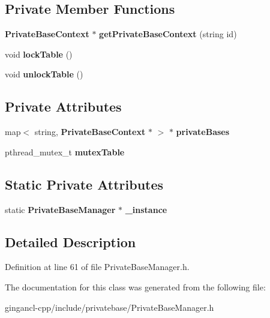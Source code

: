 \subsection*{Private Member Functions}
\begin{CompactItemize}
\item 
{\bf PrivateBaseContext} $\ast$ \textbf{getPrivateBaseContext} (string id)\label{classbr_1_1pucrio_1_1telemidia_1_1ginga_1_1ncl_1_1PrivateBaseManager_b78d7d80e50a5200083e61ab3e7e9d43}

\item 
void \textbf{lockTable} ()\label{classbr_1_1pucrio_1_1telemidia_1_1ginga_1_1ncl_1_1PrivateBaseManager_dba0565ed9dab1d1bdd3513a22ceabb3}

\item 
void \textbf{unlockTable} ()\label{classbr_1_1pucrio_1_1telemidia_1_1ginga_1_1ncl_1_1PrivateBaseManager_69bd9f7dd910e48ae15e9a4e6e870b3f}

\end{CompactItemize}
\subsection*{Private Attributes}
\begin{CompactItemize}
\item 
map$<$ string, {\bf PrivateBaseContext} $\ast$ $>$ $\ast$ {\bf privateBases}\label{classbr_1_1pucrio_1_1telemidia_1_1ginga_1_1ncl_1_1PrivateBaseManager_7aea553667207b6e4d4a44b0608a0ffe}

\item 
pthread\_\-mutex\_\-t {\bf mutexTable}\label{classbr_1_1pucrio_1_1telemidia_1_1ginga_1_1ncl_1_1PrivateBaseManager_c49695691836dad1f890543697522d80}

\end{CompactItemize}
\subsection*{Static Private Attributes}
\begin{CompactItemize}
\item 
static {\bf PrivateBaseManager} $\ast$ {\bf \_\-instance}\label{classbr_1_1pucrio_1_1telemidia_1_1ginga_1_1ncl_1_1PrivateBaseManager_6d9e0d1885f9a1bd634b6206005c0ffc}

\end{CompactItemize}


\subsection{Detailed Description}




Definition at line 61 of file PrivateBaseManager.h.

The documentation for this class was generated from the following file:\begin{CompactItemize}
\item 
gingancl-cpp/include/privatebase/PrivateBaseManager.h\end{CompactItemize}
